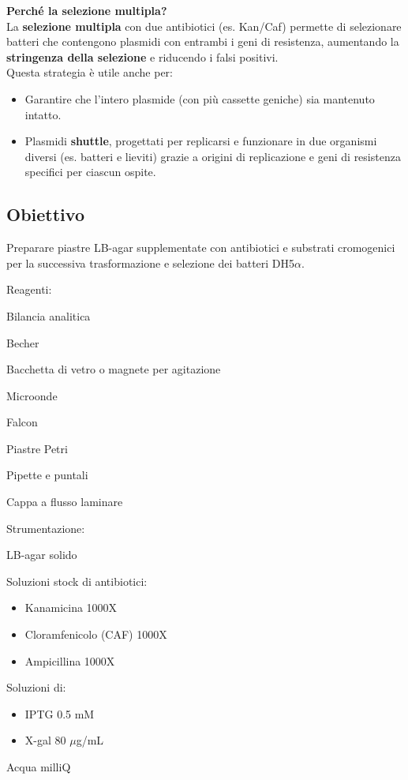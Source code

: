 \begin{percheBox}
  \textbf{Perché la selezione multipla?}
\vspace{0.5em}\\
\footnotesize{  La \textbf{selezione multipla} con due antibiotici (es. Kan/Caf) permette di selezionare batteri che contengono plasmidi con entrambi i geni di resistenza, aumentando la \textbf{stringenza della selezione} e riducendo i falsi positivi.
  \vspace{0.5em}\\Questa strategia è utile anche per: }
  \begin{itemize}
    \item Garantire che l’intero plasmide (con più cassette geniche) sia mantenuto intatto.
\item Plasmidi \textbf{shuttle}, progettati per replicarsi e funzionare in due organismi diversi (es. batteri e lieviti) grazie a origini di replicazione e geni di resistenza specifici per ciascun ospite.

  \end{itemize}
\end{percheBox}

\subsection{Obiettivo}
Preparare piastre LB-agar supplementate con antibiotici e substrati cromogenici per la successiva trasformazione e selezione dei batteri DH5$\alpha$.

  \vspace{1em}
\twoColumnLayout
    {Reagenti:}
    {
      \item Bilancia analitica
      \item Becher
      \item Bacchetta di vetro o magnete per agitazione
      \item Microonde
      \item Falcon
      \item Piastre Petri
      \item Pipette e puntali
      \item Cappa a flusso laminare
    }
  {Strumentazione:}
  {
  \item LB-agar solido
  \item Soluzioni stock di antibiotici:
    \begin{itemize}\footnotesize
      \item Kanamicina 1000X
      \item Cloramfenicolo (CAF) 1000X
      \item Ampicillina 1000X
    \end{itemize}
  \item Soluzioni di:
    \begin{itemize}\footnotesize
      \item IPTG 0.5 mM
      \item X-gal 80 $\mu$g/mL
    \end{itemize}
  \item Acqua milliQ
  }

